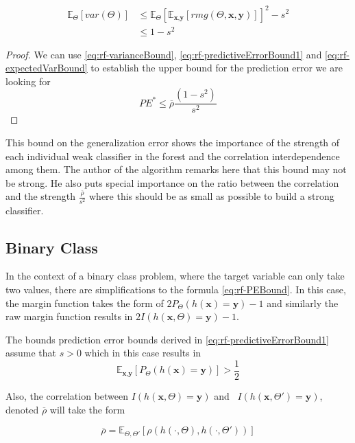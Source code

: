 \documentclass{article}%
\newcommand{\Expect}{{\mathbb{E}}}
\theoremstyle{definition}
\begin{document}
\begin{equation}\label{eq:rf-expectedVarBound}
\begin{split}
\Expect_{\Theta} \left[ var(\Theta) \right]  & \leq \Expect_{\Theta} \left[ \Expect_{\textbf{x},\textbf{y}}\left[ rmg(\Theta,\textbf{x},\textbf{y})   \right]  \right]^2 -s^2  \\
& \leq 1-s^2
\end{split}
\end{equation}

\begin{proof}
	We can use  \ref{eq:rf-varianceBound}, \ref{eq:rf-predictiveErrorBound1} and \ref{eq:rf-expectedVarBound} to establish the upper bound for the prediction error we are looking for
	\begin{equation}\label{eq:rf-PEBound}
	PE^* \leq \overline{\rho}\frac{(1-s^2)}{s^2}
	\end{equation}
\end{proof}

This bound on the generalization error shows the importance of the strength of each individual weak classifier in the forest and the correlation interdependence among them. The author \cite{breiman-randomforests} of the algorithm remarks here that this bound may not be strong. He also puts special importance on the ratio between the correlation and the strength $\frac{\overline{\rho}}{s^2}$ where this should be as small as possible to build a strong classifier. 
\subsection{Binary Class}
In the context of a binary class problem, where the target variable can only take two values, there are simplifications to the formula \ref{eq:rf-PEBound}. In this case, the margin function takes the form of $2 P_{\Theta}(h(\textbf{x}) = \textbf{y}) -1$ and similarly the raw margin function results in $2 I(h(\textbf{x}, \Theta) = \textbf{y}) -1$. 

The bounds prediction error bounds derived in \ref{eq:rf-predictiveErrorBound1} assume that $s >0$ which in this case results in
$$ \Expect_{\textbf{x},\textbf{y}} \left[ P_{\Theta}(h(\textbf{x}) = \textbf{y}) \right] > \frac{1}{2} $$

Also, the correlation between $I(h(\textbf{x}, \Theta) = \textbf{y})$ and \  $I(h(\textbf{x}, \Theta') = \textbf{y})$, denoted $\overline{\rho}$ will take the form

$$ \overline{\rho} =  \Expect_{\Theta,\Theta'} \left[ \rho \left( h(\cdot{},\Theta) ,h(\cdot{},\Theta') \right)   \right] $$
\end{document}
